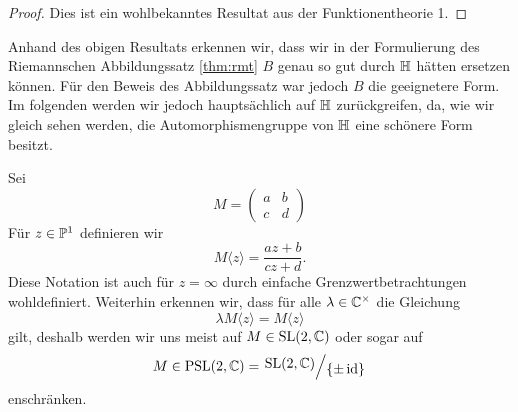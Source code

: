 \begin{proof}
  Dies ist ein wohlbekanntes Resultat aus der Funktionentheorie 1.
\end{proof}

\begin{rem}
  Anhand des obigen Resultats erkennen wir, dass wir in der Formulierung
  des Riemannschen Abbildungssatz \ref{thm:rmt} $B$ genau so gut durch
  $\h$ hätten ersetzen können. Für den Beweis des Abbildungssatz war
  jedoch $B$ die geeignetere Form. Im folgenden werden wir jedoch
  hauptsächlich auf $\h$ zurückgreifen, da, wie wir gleich sehen
  werden, die Automorphismengruppe von $\h$ eine schönere Form besitzt.
\end{rem}

\begin{defin}
  Sei
  \[
  M =
  \begin{pmatrix}
    a & b \\
    c & d
  \end{pmatrix}
  \]
  Für $z \in \P^1$ definieren wir
  \[
  M \langle z \rangle = \frac{az+b}{cz+d}.
  \]
  Diese Notation ist auch für $z = \infty$ durch einfache
  Grenzwertbetrachtungen wohldefiniert. Weiterhin erkennen wir, dass
  für alle $\lambda \in \C^\times$ die Gleichung
  \[
  \lambda M \langle z \rangle = M \langle z \rangle
  \]
  gilt, deshalb werden wir uns meist auf $M \in \SL(2, \C)$ oder sogar auf
  \[
  M \in \PSL(2, \C) = \quot{\SL(2, \C)}{\{\pm \id\}}
  \]
  enschränken.
\end{defin}

